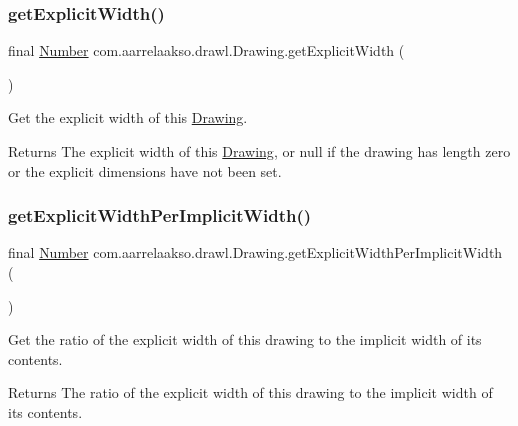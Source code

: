 \subsubsection{\texorpdfstring{get\+Explicit\+Width()}{getExplicitWidth()}}
{\footnotesize\ttfamily final \hyperlink{interfacecom_1_1aarrelaakso_1_1drawl_1_1_number}{Number} com.\+aarrelaakso.\+drawl.\+Drawing.\+get\+Explicit\+Width (\begin{DoxyParamCaption}{ }\end{DoxyParamCaption})}



Get the explicit width of this \hyperlink{classcom_1_1aarrelaakso_1_1drawl_1_1_drawing}{Drawing}. 

\begin{DoxyReturn}{Returns}
The explicit width of this \hyperlink{classcom_1_1aarrelaakso_1_1drawl_1_1_drawing}{Drawing}, or null if the drawing has length zero or the explicit dimensions have not been set. 
\end{DoxyReturn}
\mbox{\label{classcom_1_1aarrelaakso_1_1drawl_1_1_drawing_afd070929603e97a649a65a888b5f76da}} 
\subsubsection{\texorpdfstring{get\+Explicit\+Width\+Per\+Implicit\+Width()}{getExplicitWidthPerImplicitWidth()}}
{\footnotesize\ttfamily final \hyperlink{interfacecom_1_1aarrelaakso_1_1drawl_1_1_number}{Number} com.\+aarrelaakso.\+drawl.\+Drawing.\+get\+Explicit\+Width\+Per\+Implicit\+Width (\begin{DoxyParamCaption}{ }\end{DoxyParamCaption})\hspace{0.3cm}{\ttfamily [protected]}}



Get the ratio of the explicit width of this drawing to the implicit width of its contents. 

\begin{DoxyReturn}{Returns}
The ratio of the explicit width of this drawing to the implicit width of its contents. 
\end{DoxyReturn}
\mbox{\label{classcom_1_1aarrelaakso_1_1drawl_1_1_drawing_a4caf5eb85285105c951522b0079f17f1}} 
